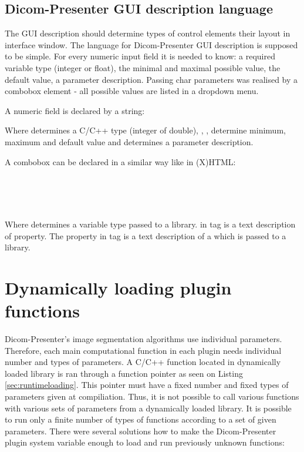 \subsection{Dicom-Presenter GUI description language}

The GUI description should determine types of control elements their layout in interface window. The language for Dicom-Presenter GUI description is supposed to be simple. For every numeric input field it is needed to know: a required variable type (integer or float), the minimal and maximal possible value, the default value, a parameter description. Passing char parameters was realised by a combobox element - all possible values are listed in a dropdown menu.

A numeric field is declared by a string:


Where  determines a C/C++ type (integer of double), , ,  determine minimum, maximum and default value and  determines a parameter description.

A combobox can be declared in a similar way like in (X)HTML:

\noindent \indent {}\\
\indent \indent {}\\
\indent \indent {}\\
\indent {}

Where  determines a variable type passed to a library.  in  tag is a text description of property. The  property in  tag is a text description of a  which is passed to a library.

\section{Dynamically loading plugin functions}

Dicom-Presenter's image segmentation algorithms use individual parameters. Therefore, each main computational function in each plugin needs individual number and types of parameters. A C/C++ function located in dynamically loaded library is ran through a function pointer as seen on Listing \ref{sec:runtimeloading}. This pointer must have a fixed number and fixed types of parameters given at compiliation. Thus, it is not possible to call various functions with various sets of parameters from a dynamically loaded library. It is possible to run only a finite number of types of functions according to a set of given parameters. There were several solutions how to make the Dicom-Presenter plugin system variable enough to load and run previously unknown functions:

